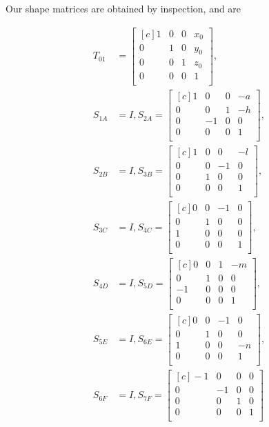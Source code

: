 \documentclass[onecolumn,10pt]{jhwhw}
\begin{document}
Our shape matrices are obtained by inspection, and are

\begin{align*}
T_{01} & =
\begin{bmatrix*}[c]
 1 & 0 & 0 & x_0 \\
 0 & 1 & 0 & y_0 \\
 0 & 0 & 1 & z_0 \\
 0 & 0 & 0 & 1 \\
\end{bmatrix*}, \\
S_{1A} &= I, 
S_{2A} =
\begin{bmatrix*}[c]
1 & 0 & 0 & -a \\
0 & 0 & 1 & -h \\
0 & -1 & 0 & 0 \\
0 & 0 & 0 & 1 \\
\end{bmatrix*}, \\
S_{2B} &= I, 
S_{3B} = 
\begin{bmatrix*}[c]
1 & 0 & 0 & -l \\
0 & 0 & -1 & 0\\
0 & 1 & 0 & 0\\
0 & 0 & 0 & 1 \\
\end{bmatrix*}, \\
S_{3C} &= I, 
S_{4C} = 
\begin{bmatrix*}[c]
0 & 0 & -1 & 0 \\
0 & 1 & 0 & 0 \\
1 & 0 & 0 & 0 \\
0 & 0 & 0 & 1 \\
\end{bmatrix*}, \\
S_{4D} &= I, 
S_{5D} = 
\begin{bmatrix*}[c]
0 & 0 & 1 & -m \\
0 & 1 & 0 & 0 \\
-1 & 0 & 0 & 0 \\
0 & 0 & 0 & 1 \\
\end{bmatrix*}, \\
S_{5E} &= I, 
S_{6E} = 
\begin{bmatrix*}[c]
0 & 0 & -1 & 0 \\
0 & 1 & 0 & 0 \\
1 & 0 & 0 & -n \\
0 & 0 & 0 & 1 \\
\end{bmatrix*}, \\
S_{6F} &= I, 
S_{7F} = 
\begin{bmatrix*}[c]
-1 & 0 & 0 & 0 \\
0 & -1 & 0 & 0 \\
0 & 0 & 1 & 0 \\
0 & 0 & 0 & 1 \\
\end{bmatrix*}
\end{align*}
\end{document}

